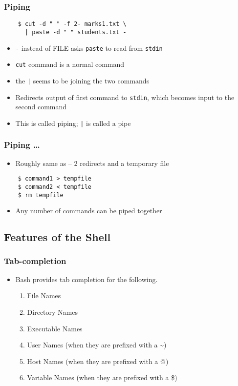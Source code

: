 \documentclass[12pt,compress]{beamer}
\begin{document}
\begin{frame}[fragile]
  \frametitle{Piping}
  \begin{lstlisting}
    $ cut -d " " -f 2- marks1.txt \
      | paste -d " " students.txt -
  \end{lstlisting} %
  \begin{itemize}
  \item \texttt{-} instead of FILE asks \texttt{paste} to read from
    \texttt{stdin}
  \item \texttt{cut} command is a normal command
  \item the \texttt{|} seems to be joining the two commands
  \item Redirects output of first command to \texttt{stdin}, which
    becomes input to the second command
  \item This is called piping; \texttt{|} is called a pipe
  \end{itemize}
\end{frame}

\begin{frame}[fragile]
  \frametitle{Piping \ldots}
  \begin{itemize}
  \item Roughly same as -- 2 redirects and a temporary file
  \end{itemize}
  \begin{lstlisting}
    $ command1 > tempfile
    $ command2 < tempfile
    $ rm tempfile
  \end{lstlisting} %
  \begin{itemize}
  \item Any number of commands can be piped together
  \end{itemize}
\end{frame}

\subsection{Features of the Shell}

\begin{frame}[fragile]
  \frametitle{Tab-completion}
  \begin{itemize}
  \item Bash provides tab completion for the following.
    \begin{enumerate}
    \item File Names
    \item Directory Names
    \item Executable Names
    \item User Names (when they are prefixed with a \~{})
    \item Host Names (when they are prefixed with a @)
    \item Variable Names (when they are prefixed with a \$)
    \end{enumerate}
  \end{itemize}
\end{frame}
\end{document}
